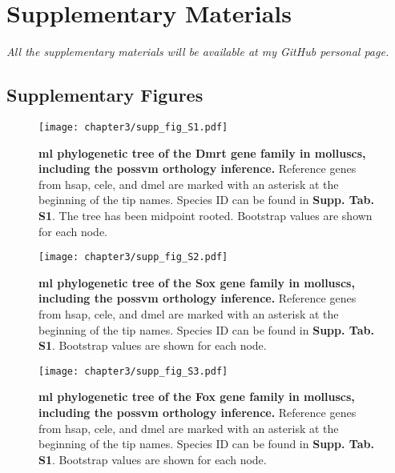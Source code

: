 \documentclass[../main.tex]{subfiles}
\begin{document}
\section{Supplementary Materials} \label{chapter3_supp}

\textit{All the supplementary materials will be available at my GitHub personal page.}

\subsection{Supplementary Figures}

\setcounter{figure}{0}
\renewcommand{\figurename}{Supplementary Figure}
\renewcommand{\thefigure}{S\arabic{chapter}.\arabic{figure}}

\begin{figure}[ht]
	\centering
	\texttt{[image: chapter3/supp\_fig\_S1.pdf]}
	\captionsetup{width=\textwidth}
	\caption{
		\textbf{\gls{ml} phylogenetic tree of the Dmrt gene family in molluscs, including the possvm orthology inference.} Reference genes from \gls{hsap}, \gls{cele}, and \gls{dmel} are marked with an asterisk at the beginning of the tip names. Species ID can be found in \textbf{Supp. Tab. S1}. The tree has been midpoint rooted. Bootstrap values are shown for each node.
	}
	\label{suppFig:dmrt_bivalves}
\end{figure}

\begin{figure}[ht]
	\centering
	\texttt{[image: chapter3/supp\_fig\_S2.pdf]}
	\captionsetup{width=\textwidth}
	\caption{
		\textbf{\gls{ml} phylogenetic tree of the Sox gene family in molluscs, including the possvm orthology inference.} Reference genes from \gls{hsap}, \gls{cele}, and \gls{dmel} are marked with an asterisk at the beginning of the tip names. Species ID can be found in \textbf{Supp. Tab. S1}. Bootstrap values are shown for each node.
	}
	\label{suppFig:sox_bivalves}
\end{figure}

\begin{figure}[ht]
	\centering
	\texttt{[image: chapter3/supp\_fig\_S3.pdf]}
	\captionsetup{width=\textwidth}
	\caption{
		\textbf{\gls{ml} phylogenetic tree of the Fox gene family in molluscs, including the possvm orthology inference.} Reference genes from \gls{hsap}, \gls{cele}, and \gls{dmel} are marked with an asterisk at the beginning of the tip names. Species ID can be found in \textbf{Supp. Tab. S1}. Bootstrap values are shown for each node.
	}
	\label{suppFig:fox_bivalves}
\end{figure}
\end{document}
